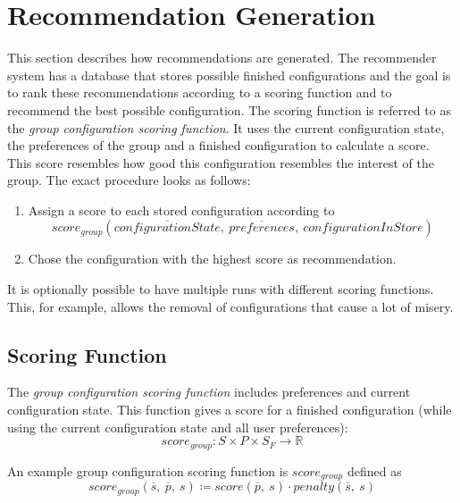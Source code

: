 \section{Recommendation Generation}
\label{sec:Concept:SolutionGeneration}

This section describes how recommendations are generated. The recommender system has a database that stores possible finished configurations and the goal is to rank these recommendations according to a scoring function and to recommend the best possible configuration. The scoring function is referred to as the \emph{group configuration scoring function}. It uses the current configuration state, the preferences of the group and a finished configuration to calculate a score. This score resembles how good this configuration resembles the interest of the group. The exact procedure looks as follows:

\begin{enumerate}
    \item Assign a score to each stored configuration according to $$score_{group}(\overline{configurationState},\ \overline{preferences}, \ configurationInStore)$$
    \item Chose the configuration with the highest score as recommendation.
\end{enumerate}

It is optionally possible to have multiple runs with different scoring functions. This, for example, allows the removal of configurations that cause a lot of misery.



\subsection{Scoring Function}

\label{subsec:Concept:SolutionGeneration:ScoringFunction}

The \emph{group configuration scoring function} includes preferences and current configuration state. This function gives a score for a finished configuration (while using the current configuration state and all user preferences):
\begin{equation}
    score_{group}: S \times P \times S_F \to \mathbb{R}
\end{equation}

An example group configuration scoring function is $score_{group}$ defined as
\begin{equation}
    score_{group}(\overline{s},\ \overline{p},\ s) \coloneqq score(\overline{p},\ s) \cdot penalty(\overline{s},\ s)
\end{equation} 

